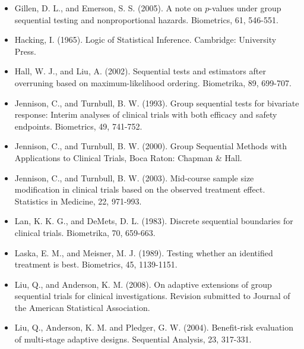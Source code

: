 \documentclass[10pt]{article}
\begin{document}
\begin{itemize}
  \item[21.] Gillen, D. L., and Emerson, S. S. (2005). A note on $p$-values under group sequential testing and nonproportional hazards. Biometrics, 61, 546-551.
  \item[22.] Hacking, I. (1965). Logic of Statistical Inference. Cambridge: University Press.
  \item[23.] Hall, W. J., and Liu, A. (2002). Sequential tests and estimators after overruning based on maximum-likelihood ordering. Biometrika, 89, 699-707.
  \item[24.] Jennison, C., and Turnbull, B. W. (1993). Group sequential tests for bivariate response: Interim analyses of clinical trials with both efficacy and safety endpoints. Biometrics, 49, 741-752.
  \item[25.] Jennison, C., and Turnbull, B. W. (2000). Group Sequential Methods with Applications to Clinical Trials, Boca Raton: Chapman \& Hall.
  \item[26.] Jennison, C., and Turnbull, B. W. (2003). Mid-course sample size modification in clinical trials based on the observed treatment effect. Statistics in Medicine, 22, 971-993.
  \item[27.] Lan, K. K. G., and DeMets, D. L. (1983). Discrete sequential boundaries for clinical trials. Biometrika, 70, 659-663.
  \item[28.] Laska, E. M., and Meisner, M. J. (1989). Testing whether an identified treatment is best. Biometrics, 45, 1139-1151.
  \item[29.] Liu, Q., and Anderson, K. M. (2008). On adaptive extensions of group sequential trials for clinical investigations. Revision submitted to Journal of the American Statistical Association.
  \item[30.] Liu, Q., Anderson, K. M. and Pledger, G. W. (2004). Benefit-risk evaluation of multi-stage adaptive designs. Sequential Analysis, 23, 317-331.
\end{itemize}
\end{document}

